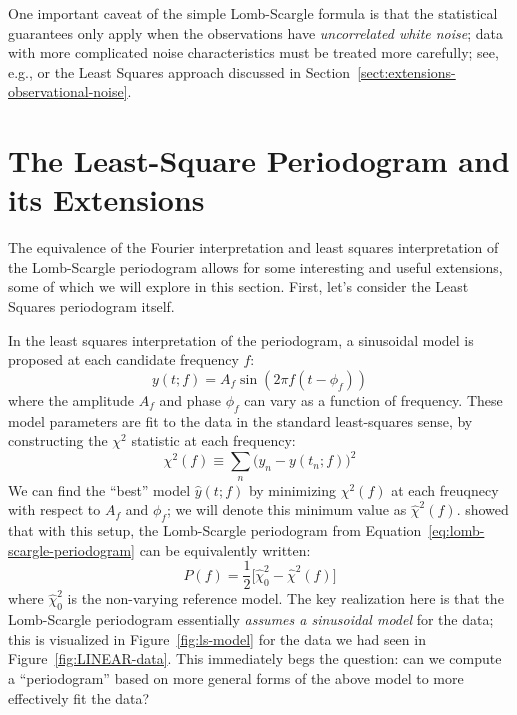 \documentclass[preprint]{aastex}
\newcommand{\fig}[1]{Figure~\ref{fig:#1}}
\newcommand{\Eq}[1]{Equation~\ref{eq:#1}}
\newcommand{\eq}[1]{\Eq{#1}}
\newcommand{\eqlabel}[1]{\label{eq:#1}}
\newcommand{\Sect}[1]{Section~\ref{sect:#1}}
\newcommand{\sect}[1]{\Sect{#1}}
\newcommand{\sectlabel}[1]{\label{sect:#1}}
\begin{document}
One important caveat of the simple Lomb-Scargle formula is that the statistical
guarantees only apply when the observations have {\it uncorrelated white
noise}; data with more complicated noise characteristics must be treated
more carefully; see, e.g., \citet{Vio2010} or the Least Squares approach
discussed in \sect{extensions-observational-noise}.


\section{The Least-Square Periodogram and its Extensions}
\sectlabel{lomb-scargle-extensions}

The equivalence of the Fourier interpretation and least squares interpretation of the Lomb-Scargle periodogram allows for some interesting and useful
extensions, some of which we will explore in this section.
First, let's consider the Least Squares periodogram itself.

In the least squares interpretation of the periodogram, a sinusoidal model is proposed at each candidate frequency $f$:
\begin{equation}
  y(t;f) = A_f \sin(2 \pi f (t - \phi_f))
\end{equation}
where the amplitude $A_f$ and phase $\phi_f$ can vary as a function of frequency.
These model parameters are fit to the data in the standard least-squares sense,
by constructing the $\chi^2$ statistic at each frequency:
\begin{equation}
  \chi^2(f) \equiv \sum_n \big(y_n - y(t_n;f)\big)^2
  \eqlabel{chi2-simple}
\end{equation}
We can find the ``best'' model $\hat{y}(t;f)$ by minimizing $\chi^2(f)$ at
each freuqnecy with respect to $A_f$ and $\phi_f$;
we will denote this minimum value as $\hat{\chi}^2(f)$.
\citet{Scargle82} showed that with this setup, the Lomb-Scargle
periodogram from \eq{lomb-scargle-periodogram} can be equivalently written:
\begin{equation}
  P(f) = \frac{1}{2}\big[\hat{\chi}^2_0 - \hat{\chi}^2(f)\big]
  \eqlabel{lomb-scargle-chi2}
\end{equation}
where $\hat{\chi}^2_0$ is the non-varying reference model.
The key realization here is that the Lomb-Scargle periodogram essentially
{\it assumes a sinusoidal model} for the data; this is visualized in
\fig{ls-model} for the data we had seen in \fig{LINEAR-data}.
This immediately begs the question: can we compute a ``periodogram'' based
on more general forms of the above model to more effectively fit the data?
\end{document}
